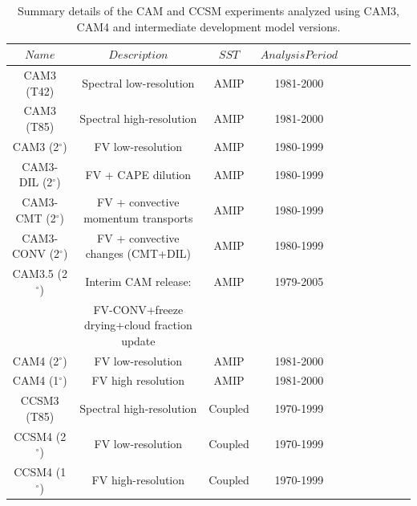 \documentclass[12pt,varwidth]{article}
\def\deg{$^\circ$}
\begin{document}
\pagebreak

\begin{table}[t]
\caption{Summary details of the CAM and CCSM experiments analyzed using CAM3, CAM4 and intermediate development model versions.}\label{t1}
\begin{center}
\begin{tabular}{cccccrrcrc}
\hline\hline
$Name$ & $Description$ &$SST$ & $Analysis Period$ \\
\hline
CAM3 (T42)       & Spectral low-resolution                         & AMIP     & 1981-2000  \\
CAM3 (T85)       & Spectral high-resolution                        & AMIP     & 1981-2000  \\
CAM3 (2\deg)     & FV low-resolution                               & AMIP     & 1980-1999  \\
CAM3-DIL (2\deg) & FV + CAPE dilution                              & AMIP     & 1980-1999  \\
CAM3-CMT (2\deg) & FV + convective momentum transports             & AMIP     & 1980-1999  \\
CAM3-CONV (2\deg)& FV + convective changes (CMT+DIL)               & AMIP     & 1980-1999  \\
CAM3.5 (2\deg)   & Interim CAM release: \citep{CCSM3.5}            & AMIP     & 1979-2005  \\
                 & FV-CONV+freeze drying+cloud fraction update     &          &            \\
CAM4 (2\deg)     & FV low-resolution                               & AMIP     & 1981-2000  \\
CAM4 (1\deg)     & FV high resolution                              & AMIP     & 1981-2000  \\
\hline
CCSM3 (T85)      & Spectral high-resolution                        & Coupled  & 1970-1999  \\
CCSM4 (2\deg)    & FV low-resolution                               & Coupled  & 1970-1999  \\
CCSM4 (1\deg)    & FV high-resolution                              & Coupled  & 1970-1999  \\
\hline
\end{tabular}
\end{center}
\end{table}
%
\end{document}
